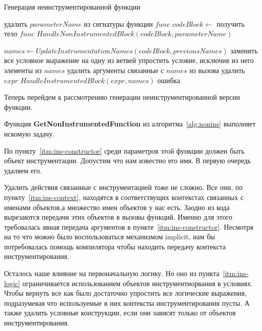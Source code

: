 \begin{algorithm}
\caption{Генерация неинструментированной функции}\label{alg:nonins}
\begin{algorithmic}[1]
  \State удалить $parameterName$ из сигнатуры функции $func$
  \State $codeBlock \gets$ получить тело $func$
  \State $HandleNonInstrumentedBlock(codeBlock, parameterName)$
\EndFunction

  \State $names \gets UpdateInstrumentationNames(codeBlock, previousNames)$
      \State заменить все условное выражение на одну из ветвей
      \State упростить условие, исключив из него элементы из $names$
      \State удалить аргументы связанные с $names$ из вызова
      \State удалить $expr$
      \State $HandleInstrumentedBlock(expr, names)$
      \State \Return ошибка
    \EndIf
  \EndFor
\EndFunction
\end{algorithmic}
\end{algorithm}

Теперь перейдем к рассмотрению генерации неинструментированной версии функции.

Функция \textbf{GetNonInstrumentedFunction} из алгоритма~\ref{alg:nonins}
выполняет искомую задачу.

По пункту~\ref{itm:ins-constructor} среди параметров этой функции должен быть
объект инструментации.
Допустим что нам известно его имя.
В первую очередь удаляем его.

Удалить действия связанные с инструментацией тоже не сложно.
Все они, по пункту~\ref{itm:ins-context}, находятся в соответствущих контекстах
связанных с именами объектов,а множество имен объектов у нас есть.
Заодно из кода вырезаются передачи этих объектов в вызовы функций.
Именно для этого требовалась явная передача аргументов в
пункте~\ref{itm:ins-constructor}.
Несмотря на то что можно было воспользоваться механизмом implicit,
нам бы потребовалась помощь компилятора чтобы находить передачу контекста
инструментирования.

Осталось наше влияние на первоначальную логику.
Но оно из пункта~\ref{itm:ins-logic} ограничивается использованием объектов
инструментиорвания в условиях.
Чтобы вернуть все как было достаточно упростить все логические выражения,
подразумевая что используемые в них контексты инструментирования пусты.
А также удалить условные конструкции, если они зависят только от объектов
инструментирования.

